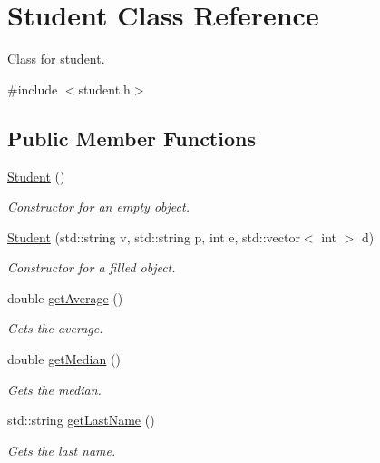 \hypertarget{class_student}{}\section{Student Class Reference}
\label{class_student}


Class for student.  




{\ttfamily \#include $<$student.\+h$>$}

\subsection*{Public Member Functions}
\begin{DoxyCompactItemize}
\item 
\mbox{\label{class_student_af9168cedbfa5565cf0b20c1a9d3f5c9d}} 
\mbox{\hyperlink{class_student_af9168cedbfa5565cf0b20c1a9d3f5c9d}{Student}} ()
\begin{DoxyCompactList}\small\item\em Constructor for an empty object. \end{DoxyCompactList}\item 
\mbox{\hyperlink{class_student_a2b3b5e10ef68426ac7e4e2247b52d7b2}{Student}} (std\+::string v, std\+::string p, int e, std\+::vector$<$ int $>$ d)
\begin{DoxyCompactList}\small\item\em Constructor for a filled object. \end{DoxyCompactList}\item 
double \mbox{\hyperlink{class_student_adc2f9fd3332da62021928fcabac83ebd}{get\+Average}} ()
\begin{DoxyCompactList}\small\item\em Gets the average. \end{DoxyCompactList}\item 
double \mbox{\hyperlink{class_student_aeb6a5deff034e8e9c2e3b066fdae1a7b}{get\+Median}} ()
\begin{DoxyCompactList}\small\item\em Gets the median. \end{DoxyCompactList}\item 
std\+::string \mbox{\hyperlink{class_student_a020b2a94967c9e5868ccc98e2fe6258b}{get\+Last\+Name}} ()
\begin{DoxyCompactList}\small\item\em Gets the last name. \end{DoxyCompactList}\item 

\end{DoxyCompactItemize}
